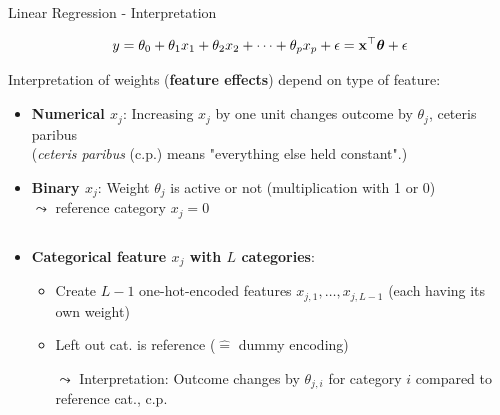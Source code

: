 \documentclass[10pt,compress,t,notes=noshow, xcolor=table]{beamer}
\begin{document}

\begin{frame}{Linear Regression - Interpretation}

 $$y = \theta_0 + \theta_1 x_1 + \theta_2 x_2 + \dots + \theta_p x_p + \epsilon = \mathbf{x}^\top \bm{\theta} + \epsilon$$

    Interpretation of weights (\textbf{feature effects}) depend on type of feature:
    \begin{itemize}[<+->]
        \item \textbf{Numerical $x_j$}: Increasing $x_j$ by one unit changes outcome by $\theta_j$, ceteris paribus \\ (\textit{ceteris paribus} (c.p.) means "everything else held constant".)
        \item \textbf{Binary $x_j$}: Weight $\theta_j$ is active or not (multiplication with 1 or 0)\\
        $\leadsto$ reference category $x_j = 0$
    \end{itemize}
%
\begin{columns}[T, totalwidth = \textwidth]
\begin{column}{0.67\textwidth}
    \begin{itemize}
        \item<3-> %
        \textbf{Categorical feature $x_j$ with $L$ categories}: 
        \begin{itemize}
            \item Create $L-1$ one-hot-encoded features $x_{j,1}, \hdots, x_{j,L-1}$ (each having its own weight)
            \item Left out cat. is reference ($\hat =$ dummy encoding)
            \item[$\leadsto$] Interpretation:
        Outcome changes by $\theta_{j,i}$ for category $i$ compared to reference cat.,  c.p.
        \end{itemize}

\end{itemize}
\end{column}
\end{columns}
\end{frame}
\end{document}
